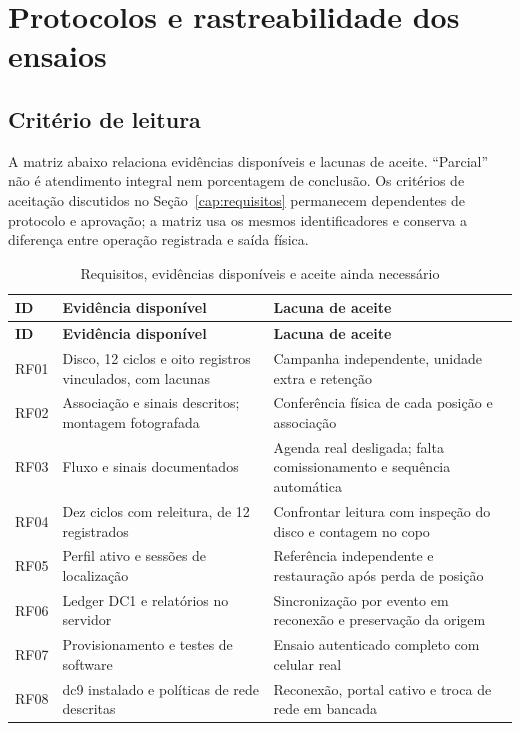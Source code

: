 \chapter{Protocolos e rastreabilidade dos ensaios}\label{ap:ensaios}
\section{Critério de leitura}
A matriz abaixo relaciona evidências disponíveis e lacunas de aceite. ``Parcial'' não é atendimento integral nem porcentagem de conclusão. Os critérios de aceitação discutidos no Seção~\ref{cap:requisitos} permanecem dependentes de protocolo e aprovação; a matriz usa os mesmos identificadores e conserva a diferença entre operação registrada e saída física. 

{\small\setlength{\tabcolsep}{3pt}
\begin{longtable}{p{}p{}p{}}
\caption{Requisitos, evidências disponíveis e aceite ainda necessário}\label{tab:ap-matriz}\\
\hline\textbf{ID} & \textbf{Evidência disponível} & \textbf{Lacuna de aceite}\\\hline\endfirsthead
\hline\textbf{ID} & \textbf{Evidência disponível} & \textbf{Lacuna de aceite}\\\hline\endhead
RF01 & Disco, 12 ciclos e oito registros vinculados, com lacunas & Campanha independente, unidade extra e retenção\\\hline
RF02 & Associação e sinais descritos; montagem fotografada & Conferência física de cada posição e associação\\\hline
RF03 & Fluxo e sinais documentados & Agenda real desligada; falta comissionamento e sequência automática\\\hline
RF04 & Dez ciclos com releitura, de 12 registrados & Confrontar leitura com inspeção do disco e contagem no copo\\\hline
RF05 & Perfil ativo e sessões de localização & Referência independente e restauração após perda de posição\\\hline
RF06 & Ledger DC1 e relatórios no servidor & Sincronização por evento em reconexão e preservação da origem\\\hline
RF07 & Provisionamento e testes de software & Ensaio autenticado completo com celular real\\\hline
RF08 & dc9 instalado e políticas de rede descritas & Reconexão, portal cativo e troca de rede em bancada\\\hline

\end{longtable}}
